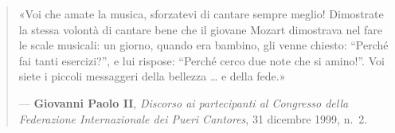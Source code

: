 \documentclass[12pt,a4paper]{article}
\begin{document}
	\begin{quote}
		«Voi che amate la musica, sforzatevi di cantare sempre meglio! Dimostrate la stessa volontà di cantare bene che il giovane Mozart dimostrava nel fare le scale musicali: un giorno, quando era bambino, gli venne chiesto: ``Perché fai tanti esercizi?'', e lui rispose: ``Perché cerco due note che si amino!''. Voi siete i piccoli messaggeri della bellezza \ldots{} e della fede.»
		
		--- \textbf{Giovanni Paolo II}, \emph{Discorso ai partecipanti al Congresso della Federazione Internazionale dei Pueri Cantores}, 31 dicembre 1999, n.~2.
	\end{quote}
	
\end{document}
